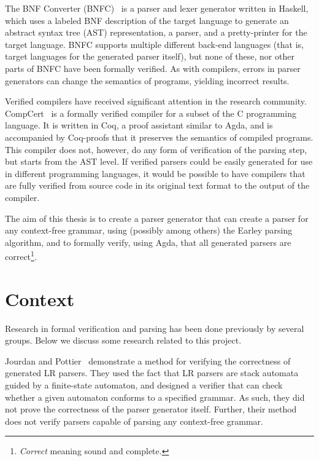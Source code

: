 \documentclass{article}
\begin{document}
	The BNF Converter (BNFC)~\cite{BNFC} is a parser and lexer generator
	written in Haskell, which uses a labeled BNF description of the target
	language to generate an abstract syntax tree (AST) representation, a
	parser, and a pretty-printer for the target language. BNFC supports
	multiple different back-end languages (that is, target languages for the
	generated parser itself), but none of these, nor other parts of BNFC have
	been formally verified. As with compilers, errors in parser generators can
	change the semantics of programs, yielding incorrect results.



	Verified compilers have received significant attention in the research
	community. CompCert~\cite{Leroy} is a formally verified compiler for a
	subset of the C programming language. It is written in Coq, a proof
	assistant similar to Agda, and is accompanied by Coq-proofs that it
	preserves the semantics of compiled programs.  This compiler does not,
	however, do any form of verification of the parsing step, but starts from
	the AST level. If verified parsers could be easily generated for use in
	different programming languages, it would be possible to have compilers
	that are fully verified from source code in its original text format to the
	output of the compiler.

	The aim of this thesis is to create a parser generator that can create a
	parser for any context-free grammar, using (possibly among others) the
	Earley parsing algorithm, and to formally verify, using Agda, that all
	generated parsers are correct\footnote{\emph{Correct} meaning sound and
	complete.}.


\section{Context}

	Research in formal verification and parsing has been done previously by
	several groups. Below we discuss some research related to this project.

	Jourdan and Pottier~\cite{Jourdan} demonstrate a method for verifying the
	correctness of generated LR parsers. They used the fact that LR parsers are
	stack automata guided by a finite-state automaton, and designed a verifier
	that can check whether a given automaton conforms to a specified grammar.
	As such, they did not prove the correctness of the parser generator itself.
	Further, their method does not verify parsers capable of parsing any
	context-free grammar.
\end{document}

